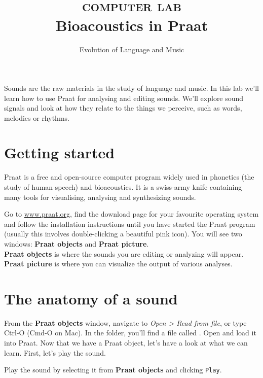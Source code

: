 \documentclass[a4paper, 9pt]{article}
\title{\textsc{computer lab}\\ \textbf{Bioacoustics in Praat}}
\author{Evolution of Language and Music}
\date{}
\begin{document}
\maketitle
{}

\begin{goals}
Sounds are the raw materials in the study of language and music. In this
lab we'll learn how to use Praat for analysing and editing sounds. We'll
explore sound signals and look at how they relate to the things we
perceive, such as words, melodies or rhythms.
\end{goals}

\section{Getting started}\label{getting-started}

Praat is a free and open-source computer program widely used in
phonetics (the study of human speech) and bioacoustics. It is a
swiss-army knife containing many tools for visualising, analysing and
synthesizing sounds.

\begin{exercise}
  \action Go to \url{www.praat.org}, find the download page for your favourite operating system and follow the installation instructions until you have started the Praat program (usually this involves double-clicking a beautiful pink icon).
  \action You will see two windows: \textbf{Praat objects} and \textbf{Praat
  picture}. \\
  \textbf{Praat objects} is where the sounds you are editing or
  analyzing will appear. \textbf{Praat picture} is where you can visualize
  the output of various analyses.
\end{exercise}


\section{The anatomy of a sound}\label{the-anatomy-of-a-sound}

From the \textbf{Praat objects} window, navigate to \emph{Open
> Read from file}, or type Ctrl-O (Cmd-O on Mac). In the 
folder, you'll find a file called . Open and load it into
Praat. Now that we have a Praat object, let's have a look at what we can
learn. First, let's play the sound.

\begin{exercise}
\action Play the sound by selecting it from \textbf{Praat objects} and clicking \texttt{Play}.
\end{exercise}
\end{document}

